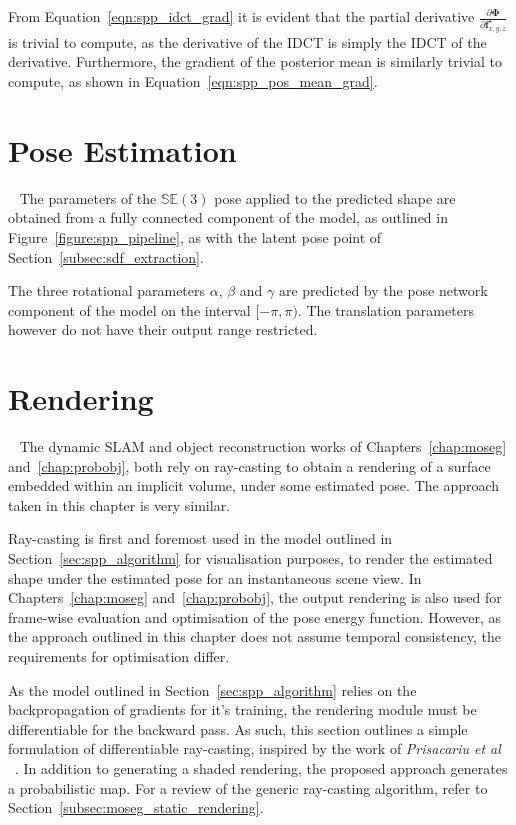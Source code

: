 From Equation~\ref{eqn:spp_idct_grad} it is evident that the partial derivative 
\( \frac{\partial \bm{\Phi}}{\partial \bm{f}_{x, y, z}^{\star}} \) is trivial 
to compute, as the derivative of the IDCT is simply the IDCT of the derivative. 
Furthermore, the gradient of the posterior mean is similarly trivial to compute, as shown 
in Equation~\ref{eqn:spp_pos_mean_grad}.

\section{Pose Estimation}
~\label{sec:spp_pose_estim}
The parameters of the \( \mathbb{SE}(3) \) pose applied to the predicted shape are obtained 
from a fully connected component of the model, as outlined in Figure~\ref{figure:spp_pipeline}, as with the 
latent pose point of Section~\ref{subsec:sdf_extraction}.

The three rotational parameters \( \alpha \), \( \beta \) and \( \gamma \) are predicted by 
the pose network component of the model on the interval \( [-\pi, \pi) \). The translation parameters 
however do not have their output range restricted.

\section{Rendering}
~\label{sec:spp_rendering}
The dynamic SLAM and object reconstruction works of Chapters~\ref{chap:moseg} and~\ref{chap:probobj}, 
both rely on ray-casting to obtain a rendering of a surface embedded within an implicit volume, under 
some estimated pose. The approach taken in this chapter is very similar. 

Ray-casting is first and foremost used in the model outlined in Section~\ref{sec:spp_algorithm} for 
visualisation purposes, to render the estimated shape under the estimated pose for an instantaneous scene 
view. In Chapters~\ref{chap:moseg} and~\ref{chap:probobj}, the output rendering is also used for frame-wise 
evaluation and optimisation of the pose energy function. However, as the approach outlined in this chapter 
does not assume temporal consistency, the requirements for optimisation differ.

As the model outlined in Section~\ref{sec:spp_algorithm} relies on the backpropagation of gradients for it's 
training, the rendering module must be differentiable for the backward pass. As such, this section outlines a 
simple formulation of differentiable ray-casting, inspired by the work of \textit{Prisacariu et al}
~\cite{Prisacariu2011}. In addition to generating a shaded rendering, the proposed approach generates a 
probabilistic map. For a review of the generic ray-casting algorithm, refer to Section~\ref{subsec:moseg_static_rendering}.

